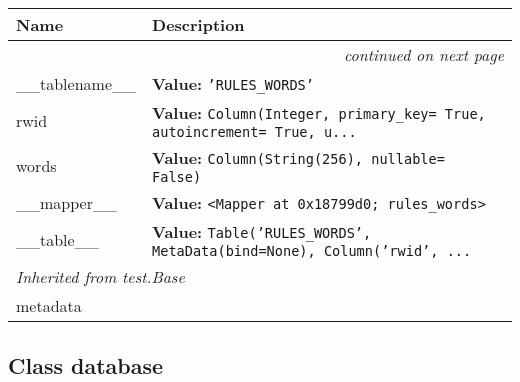     \vspace{-1cm}
\hspace{\varindent}\begin{longtable}{|p{\varnamewidth}|p{\vardescrwidth}|l}
\cline{1-2}
\cline{1-2} \centering \textbf{Name} & \centering \textbf{Description}& \\
\cline{1-2}
\endhead\cline{1-2}\multicolumn{3}{r}{\small\textit{continued on next page}}\\\endfoot\cline{1-2}
\endlastfoot\raggedright \_\-\_\-t\-a\-b\-l\-e\-n\-a\-m\-e\-\_\-\_\- & \raggedright \textbf{Value:} 
{\tt \texttt{'}\texttt{RULES\_WORDS}\texttt{'}}&\\
\cline{1-2}
\raggedright r\-w\-i\-d\- & \raggedright \textbf{Value:} 
{\tt Column(Integer, primary\_key= True, autoincrement= True, u\texttt{...}}&\\
\cline{1-2}
\raggedright w\-o\-r\-d\-s\- & \raggedright \textbf{Value:} 
{\tt Column(String(256), nullable= False)}&\\
\cline{1-2}
\raggedright \_\-\_\-m\-a\-p\-p\-e\-r\-\_\-\_\- & \raggedright \textbf{Value:} 
{\tt {\textless}Mapper at 0x18799d0; rules\_words{\textgreater}}&\\
\cline{1-2}
\raggedright \_\-\_\-t\-a\-b\-l\-e\-\_\-\_\- & \raggedright \textbf{Value:} 
{\tt Table('RULES\_WORDS', MetaData(bind=None), Column('rwid', \texttt{...}}&\\
\cline{1-2}
\multicolumn{2}{|l|}{\textit{Inherited from test.Base}}\\
\multicolumn{2}{|p{\varwidth}|}{\raggedright metadata}\\
\cline{1-2}
\end{longtable}



\subsection{Class database}

    \label{test:database}



